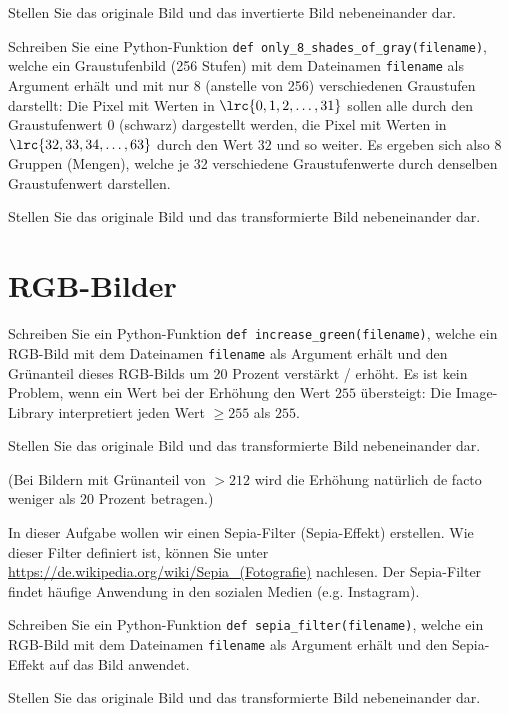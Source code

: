 \begin{questions}
	Stellen Sie das originale Bild und das invertierte Bild nebeneinander dar.


	Schreiben Sie eine Python-Funktion \lstinline|def only_8_shades_of_gray(filename)|, welche ein Graustufenbild (256 Stufen) mit dem Dateinamen \lstinline|filename| als Argument erhält und mit nur 8 (anstelle von 256) verschiedenen Graustufen darstellt: Die Pixel mit Werten in $\lrc{0, 1, 2, \ldots, 31}$ sollen alle durch den Graustufenwert $0$ (schwarz) dargestellt werden, die Pixel mit Werten in $\lrc{32,33,34,\ldots, 63}$ durch den Wert $32$ und so weiter. Es ergeben sich also 8 Gruppen (Mengen), welche je 32 verschiedene Graustufenwerte durch denselben Graustufenwert darstellen.

	Stellen Sie das originale Bild und das transformierte Bild nebeneinander dar.



	\section*{RGB-Bilder}

	Schreiben Sie ein Python-Funktion \lstinline|def increase_green(filename)|, welche ein RGB-Bild mit dem Dateinamen \lstinline|filename| als Argument erhält und den Grünanteil dieses RGB-Bilds um 20 Prozent verstärkt / erhöht. Es ist kein Problem, wenn ein Wert bei der Erhöhung den Wert $255$ übersteigt: Die Image-Library interpretiert jeden Wert $\geq 255$ als $255$.

	Stellen Sie das originale Bild und das transformierte Bild nebeneinander dar.

	(Bei Bildern mit Grünanteil von $> 212$ wird die Erhöhung natürlich de facto weniger als 20 Prozent betragen.)



	In dieser Aufgabe wollen wir einen Sepia-Filter (Sepia-Effekt) erstellen. Wie dieser Filter definiert ist, können Sie unter \url{https://de.wikipedia.org/wiki/Sepia_(Fotografie)} nachlesen. Der Sepia-Filter findet häufige Anwendung in den sozialen Medien (e.g. Instagram).

	Schreiben Sie ein Python-Funktion \lstinline|def sepia_filter(filename)|, welche ein RGB-Bild mit dem Dateinamen \lstinline|filename| als Argument erhält und den Sepia-Effekt auf das Bild anwendet.

	Stellen Sie das originale Bild und das transformierte Bild nebeneinander dar.



\end{questions}
